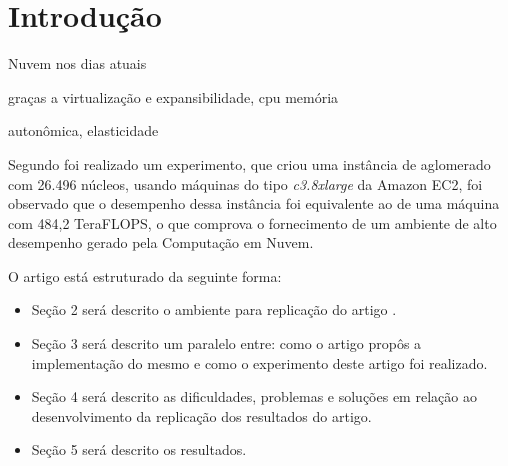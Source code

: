 \section{Introdução}

Nuvem nos dias atuais

graças a virtualização e expansibilidade, cpu memória

autonômica, elasticidade

Segundo \cite{coutinho_et_al:14} foi realizado um experimento, que criou uma instância de aglomerado com 26.496 núcleos, usando máquinas do tipo \textit{c3.8xlarge} da Amazon EC2, foi observado que o desempenho dessa instância foi equivalente ao de uma máquina com 484,2 TeraFLOPS, o que comprova o fornecimento de um ambiente de alto desempenho gerado pela Computação em Nuvem.

O artigo está estruturado da seguinte forma:
\begin{itemize}
  \item Seção 2 será descrito o ambiente para replicação do artigo \cite{coutinho_et_al:14}.
  \item Seção 3 será descrito um paralelo entre: como o artigo propôs a implementação do mesmo e como o experimento deste artigo foi realizado.
  \item Seção 4 será descrito as dificuldades, problemas e soluções em relação ao desenvolvimento da replicação dos resultados do artigo.
  \item Seção 5 será descrito os resultados.
\end{itemize}

